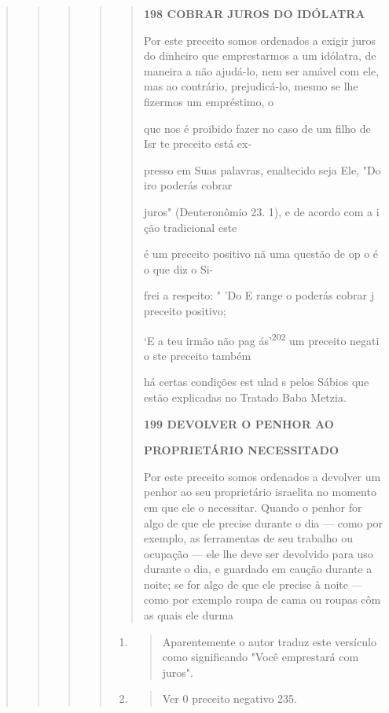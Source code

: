 \begin{quote}
\begin{quote}
\begin{quote}
\begin{quote}
\begin{quote}
\textbf{198 COBRAR JUROS DO IDÓLATRA}

Por este preceito somos ordenados a exigir juros do dinheiro que
emprestarmos a um idólatra, de maneira a não ajudá-lo, nem ser amável
com ele, mas ao contrário, prejudicá-lo, mesmo se lhe fizermos um
empréstimo, o

que nos é proibido fazer no caso de um filho de Isr te preceito está ex-

presso em Suas palavras, enaltecido seja Ele, "Do iro poderás cobrar

juros" (Deuteronômio 23. 1), e de acordo com a i ção tradicional este

é um preceito positivo nã uma questão de op o é o que diz o Si-

frei a respeito: " 'Do E range o poderás cobrar j preceito positivo;

`E a teu irmão não pag ás'\textsuperscript{202} um preceito negati o ste
preceito também

há certas condições est ulad s pelos Sábios que estão explicadas no
Tratado Baba Metzia.

\textbf{199 DEVOLVER O PENHOR AO}

\textbf{PROPRIETÁRIO NECESSITADO}

Por este preceito somos ordenados a devolver um penhor ao seu
proprietário israelita no momento em que ele o necessitar. Quando o
penhor for algo de que ele precise durante o dia --- como por exemplo,
as ferramentas de seu trabalho ou ocupação --- ele lhe deve ser
devolvido para uso durante o dia, e guardado em caução durante a noite;
se for algo de que ele precise à noite --- como por exemplo roupa de
cama ou roupas côm as quais ele durma
\end{quote}

\begin{enumerate}
\def\labelenumi{\arabic{enumi}.}
\setcounter{enumi}{200}
\item
 \begin{quote}
 Aparentemente o autor traduz este versículo como significando "Você
 emprestará com juros".
 \end{quote}
\item
 \begin{quote}
 Ver 0 preceito negativo 235.
 \end{quote}
\end{enumerate}

\begin{quote}



\end{quote}
\end{quote}
\end{quote}
\end{quote}
\end{quote}
